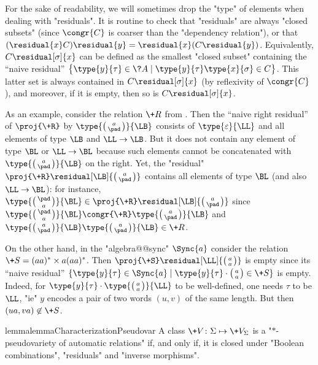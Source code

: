 For the sake of readability, we will sometimes drop the "type" of elements when dealing
with "residuals".
It is routine to check that "residuals" are always "closed subsets" (since $\congr{C}$ is coarser than the "dependency relation"), or that $(\residual{x} C)\residual{y} =
\residual{x} (C\residual{y})$.
Equivalently, $C\residual[\sigma]{x}$ can be defined as the smallest "closed subset"
containing the ``naive residual''
$\bigl\{
	\type{y}{\tau} \in \?A \mid
		\type{y}{\tau}\type{x}{\sigma} \in C
\bigr\}$.
This latter set is always contained in $C\residual[\sigma]{x}$ (by reflexivity of $\congr{C}$),
and moreover, if it is empty, then so is $C\residual[\sigma]{x}$.

As an example, consider the relation $\+R$ from .
Then the ``naive right residual'' of $\proj{\+R}$ by $\type{\pair{a}{\pad}}{\LB}$
consists of $\type{\varepsilon}{\LL}$ and all elements of type $\LB$ and $\LL\to\LB$.
But it does not contain any element of type $\BL$ or $\LL\to\BL$ because such elements cannot be concatenated with $\type{\pair{a}{\pad}}{\LB}$ on the right.
Yet, the "residual" 
$\proj{\+R} \residual[\LB]{\pair{a}{\pad}}$ contains all elements of type $\BL$ (and also $\LL\to\BL$): for instance, $\type{\pair{\pad}{a}}{\BL} \in
\proj{\+R} \residual[\LB]{\pair{a}{\pad}}$ since $\type{\pair{\pad}{a}}{\BL} \congr{\+R} \type{\pair{a}{\pad}}{\LB}$
and $\type{\pair{a}{\pad}}{\LB} \type{\pair{a}{\pad}}{\LB} \in \+R$.

On the other hand, in the "algebra@@sync" $\Sync{a}$ consider the relation
$\+S = (aa)^*\times a(aa)^*$.
Then $\proj{\+S}\residual[\LL]{\pair{a}{a}}$ is empty since its 
``naive residual'' $\{\type{y}{\tau} \in \Sync{a} \mid \type{y}{\tau}\cdot\pair{a}{a} \in \+S\}$
is empty. Indeed, for $\type{y}{\tau}\cdot\type{\pair{a}{a}}{\LL}$ to
be well-defined, one needs $\tau$ to be $\LL$, "ie" $y$ encodes a pair of
two words $(u,v)$ of the same length. But then $(ua, va) \not\in \+S$.

\begin{restatable}{lemma}{lemmaCharacterizationPseudovar}
	\AP\label{lemma:characterization-pseudovarieties-syncrel}
	A class $\+V\colon \Sigma \mapsto \+V_\Sigma$ is a "$\ast$-pseudovariety of automatic relations" if, and only if, it is closed under "Boolean combinations", "residuals" and
	"inverse morphisms".
\end{restatable}

